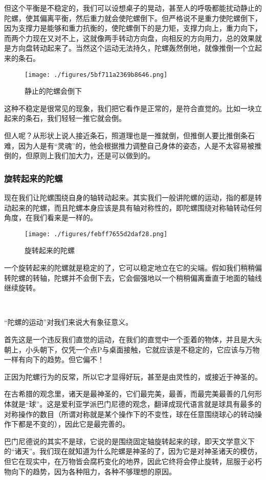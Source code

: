 但这个平衡是不稳定的，我们可以设想桌子的晃动，甚至人的呼吸都能扰动静止的陀螺，使其偏离平衡，然后重力就会使陀螺倒下。但严格说不是重力使陀螺倒下，因为支撑力是能够和重力抗衡的，使陀螺倒下的是力矩，支撑力向上，重力向下，而两个力现在又对不上，这就像两手转动方向盘，向相反的方向用力，总的效果就是方向盘转动起来了。当然这个运动无法持久，陀螺轰然倒地，就像推倒一个立起来的条石。
\begin{figure}[ht]
\centering
\texttt{[image: ./figures/5bf711a2369b8646.png]}
\caption{静⽌的陀螺会倒下} \label{fig_QMPre2_3}
\end{figure}
这种不稳定是很常见的现象，我们把它看作是正常的，是符合直觉的。比如一块立起来的条石，我们轻轻一推它就会倒。

但人呢？从形状上说人接近条石，照道理也是一推就倒，但推倒人要比推倒条石难，因为人是有“灵魂”的，他会根据推力调整自己身体的姿态，人是不太容易被推倒的，但原则上我们加大力，还是可以做到的。

\subsubsection{旋转起来的陀螺}

现在我们让陀螺围绕自身的轴转动起来。其实我们一般讲陀螺的运动，指的都是转动起来的陀螺，而且陀螺本身应该是具有轴对称性的，即陀螺围绕对称轴转动任何角度，在我们看来是一样的。
\begin{figure}[ht]
\centering
\texttt{[image: ./figures/febff7655d2daf28.png]}
\caption{ 旋转起来的陀螺} \label{fig_QMPre2_4}
\end{figure}
一个旋转起来的陀螺就是稳定的了，它可以稳定地立在它的尖端。假如我们稍稍偏转陀螺的转轴，陀螺并不会倒下去，它会倔强地以一个稍稍偏离垂直于地面的轴线继续旋转。

~

“陀螺的运动”对我们来说大有象征意义。

首先这是一个违反我们直觉的运动，在我们的直觉中一个歪着的物体，并且是大头朝上，小头朝下，仅凭一个点P与桌面接触，它就应该是不稳定的，它应该与万物一样有向下的趋势。但它偏不！

正因为陀螺行为的反常，所以它才显得好玩，甚至是由灵性的，或接近于神圣的。

在古希腊的观念里，诸天是最神圣的，它们最完美，最善，而最完美最善的几何形体就是“球”。这是爱利亚学派巴门尼德的观念，翻译成现代语言就是球具有最多的对称操作的数目（所谓对称就是某个操作下的不变性，球在任意围绕球心的转动操作下都是不变的），因此它是最完善的。

巴门尼德说的其实不是球，它说的是围绕固定轴旋转起来的球，即天文学意义下的“诸天”。我们现在就知道为什么陀螺是神圣的了，因为它是对神圣诸天的模仿，但它在现实中，在万物皆会腐朽变化的地界，因此它终将会停止旋转，屈服于必朽物向下的趋势，因为各种阻力，各种不够理想的原因。

